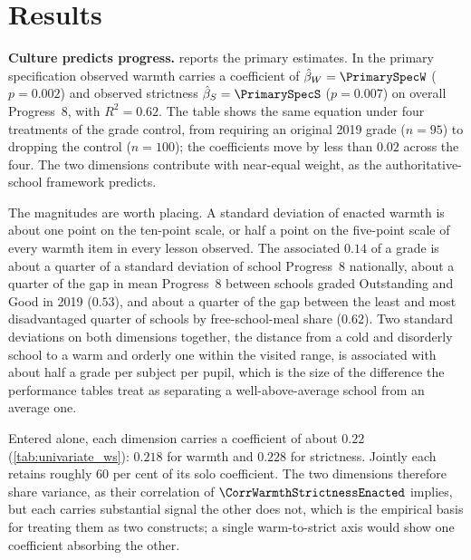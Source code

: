 \section{Results}
\label{sec:p2_results}

\textbf{Culture predicts progress.}  reports the
primary estimates. In the primary specification observed warmth carries a
coefficient of $\hat{\beta}_W = \PrimarySpecW$ ($p = 0.002$) and observed
strictness $\hat{\beta}_S = \PrimarySpecS$ ($p = 0.007$) on overall
Progress~8, with $R^2 = 0.62$. The table shows the same equation under four
treatments of the grade control, from requiring an original 2019 grade
($n = 95$) to dropping the control ($n = 100$); the coefficients move by less
than $0.02$ across the four. The two dimensions contribute with near-equal
weight, as the authoritative-school framework predicts.



The magnitudes are worth placing. A standard deviation of enacted warmth is
about one point on the ten-point scale, or half a point on the five-point
scale of every warmth item in every lesson observed. The associated $0.14$ of a grade is about a quarter of a
standard deviation of school Progress~8 nationally, about a quarter of the
gap in mean Progress~8 between schools graded Outstanding and Good in 2019
($0.53$), and about a quarter of the gap between the least and most
disadvantaged quarter of schools by free-school-meal share ($0.62$). Two
standard deviations on both dimensions together, the distance from a cold
and disorderly school to a warm and orderly one within the visited range,
is associated with about half a grade per subject per pupil, which is the
size of the difference the performance tables treat as separating a
well-above-average school from an average one.

Entered alone, each dimension carries a coefficient of about $0.22$
(\cref{tab:univariate_ws}): $0.218$ for warmth and $0.228$ for strictness.
Jointly each retains roughly 60 per cent of its solo coefficient. The two
dimensions therefore share variance, as their correlation of
$\CorrWarmthStrictnessEnacted$ implies, but each carries substantial signal
the other does not, which is the empirical basis for treating them as two
constructs; a single warm-to-strict axis would show one coefficient
absorbing the other.



